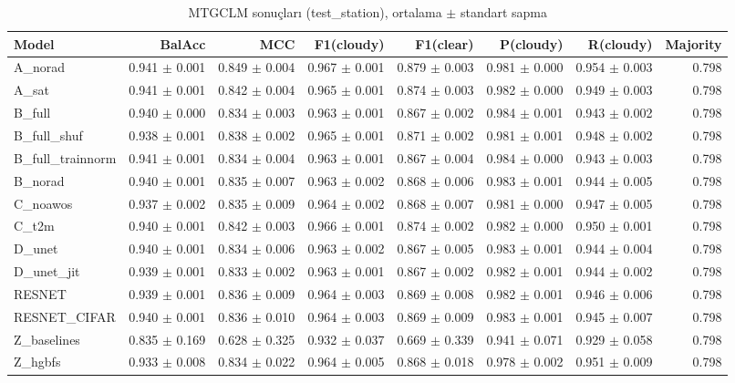 \begin{table}[ht]
\centering
\caption{MTGCLM sonuçları (test_station), ortalama $\pm$ standart sapma}
\label{tab:results_test_station}
\begin{tabular}{lrrrrrrr}
\hline
Model & BalAcc & MCC & F1(cloudy) & F1(clear) & P(cloudy) & R(cloudy) & Majority \\
\hline
A\_norad & 0.941 $\pm$ 0.001 & 0.849 $\pm$ 0.004 & 0.967 $\pm$ 0.001 & 0.879 $\pm$ 0.003 & 0.981 $\pm$ 0.000 & 0.954 $\pm$ 0.003 & 0.798 \\
A\_sat & 0.941 $\pm$ 0.001 & 0.842 $\pm$ 0.004 & 0.965 $\pm$ 0.001 & 0.874 $\pm$ 0.003 & 0.982 $\pm$ 0.000 & 0.949 $\pm$ 0.003 & 0.798 \\
B\_full & 0.940 $\pm$ 0.000 & 0.834 $\pm$ 0.003 & 0.963 $\pm$ 0.001 & 0.867 $\pm$ 0.002 & 0.984 $\pm$ 0.001 & 0.943 $\pm$ 0.002 & 0.798 \\
B\_full\_shuf & 0.938 $\pm$ 0.001 & 0.838 $\pm$ 0.002 & 0.965 $\pm$ 0.001 & 0.871 $\pm$ 0.002 & 0.981 $\pm$ 0.001 & 0.948 $\pm$ 0.002 & 0.798 \\
B\_full\_trainnorm & 0.941 $\pm$ 0.001 & 0.834 $\pm$ 0.004 & 0.963 $\pm$ 0.001 & 0.867 $\pm$ 0.004 & 0.984 $\pm$ 0.000 & 0.943 $\pm$ 0.003 & 0.798 \\
B\_norad & 0.940 $\pm$ 0.001 & 0.835 $\pm$ 0.007 & 0.963 $\pm$ 0.002 & 0.868 $\pm$ 0.006 & 0.983 $\pm$ 0.001 & 0.944 $\pm$ 0.005 & 0.798 \\
C\_noawos & 0.937 $\pm$ 0.002 & 0.835 $\pm$ 0.009 & 0.964 $\pm$ 0.002 & 0.868 $\pm$ 0.007 & 0.981 $\pm$ 0.000 & 0.947 $\pm$ 0.005 & 0.798 \\
C\_t2m & 0.940 $\pm$ 0.001 & 0.842 $\pm$ 0.003 & 0.966 $\pm$ 0.001 & 0.874 $\pm$ 0.002 & 0.982 $\pm$ 0.000 & 0.950 $\pm$ 0.001 & 0.798 \\
D\_unet & 0.940 $\pm$ 0.001 & 0.834 $\pm$ 0.006 & 0.963 $\pm$ 0.002 & 0.867 $\pm$ 0.005 & 0.983 $\pm$ 0.001 & 0.944 $\pm$ 0.004 & 0.798 \\
D\_unet\_jit & 0.939 $\pm$ 0.001 & 0.833 $\pm$ 0.002 & 0.963 $\pm$ 0.001 & 0.867 $\pm$ 0.002 & 0.982 $\pm$ 0.001 & 0.944 $\pm$ 0.002 & 0.798 \\
RESNET & 0.939 $\pm$ 0.001 & 0.836 $\pm$ 0.009 & 0.964 $\pm$ 0.003 & 0.869 $\pm$ 0.008 & 0.982 $\pm$ 0.001 & 0.946 $\pm$ 0.006 & 0.798 \\
RESNET\_CIFAR & 0.940 $\pm$ 0.001 & 0.836 $\pm$ 0.010 & 0.964 $\pm$ 0.003 & 0.869 $\pm$ 0.009 & 0.983 $\pm$ 0.001 & 0.945 $\pm$ 0.007 & 0.798 \\
Z\_baselines & 0.835 $\pm$ 0.169 & 0.628 $\pm$ 0.325 & 0.932 $\pm$ 0.037 & 0.669 $\pm$ 0.339 & 0.941 $\pm$ 0.071 & 0.929 $\pm$ 0.058 & 0.798 \\
Z\_hgbfs & 0.933 $\pm$ 0.008 & 0.834 $\pm$ 0.022 & 0.964 $\pm$ 0.005 & 0.868 $\pm$ 0.018 & 0.978 $\pm$ 0.002 & 0.951 $\pm$ 0.009 & 0.798 \\
\hline
\end{tabular}
\end{table}

